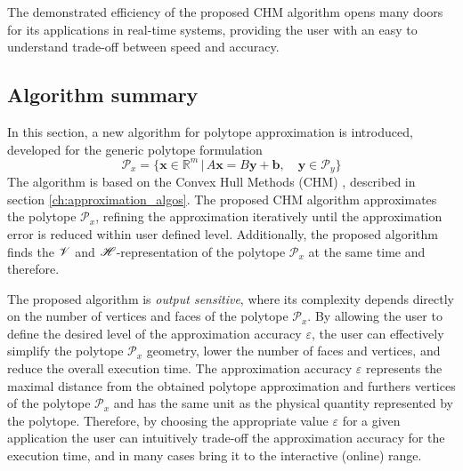 The demonstrated efficiency of the proposed CHM algorithm opens many doors for its applications in real-time systems, providing the user with an easy to understand trade-off between speed and accuracy.

\subsection{Algorithm summary}

In this section, a new algorithm for polytope approximation is introduced, developed for the generic polytope formulation
\begin{equation}
    \mathcal{P}_x = \big\{ \bm{x}\in \mathbb{R}^{m}\, |\,A\bm{x} = B\bm{y} + \bm{b}, \quad  \bm{y}\in\mathcal{P}_y  \big\}
    \label{eq:generic_polyt_view_revisit3}
\end{equation}
The algorithm is based on the Convex Hull Methods (CHM) \cite{lassez1992quantifier}, described in section \ref{ch:approximation_algos}. The proposed CHM algorithm approximates the polytope $\mathcal{P}_x$, refining the approximation iteratively until the approximation error is reduced within user defined level. 
Additionally, the proposed algorithm finds the $\mathscr{V}$ and $\mathscr{H}$-representation of the polytope $\mathcal{P}_x$ at the same time and therefore.

The proposed algorithm is \textit{output sensitive}, where its complexity depends directly on the number of vertices and faces of the polytope  $\mathcal{P}_x$. By allowing the user to define the desired level of the approximation accuracy $\varepsilon$, the user can effectively simplify the polytope $\mathcal{P}_x$ geometry, lower the number of faces and vertices, and reduce the overall execution time. 
The approximation accuracy $\varepsilon$ represents the maximal distance from the obtained polytope approximation and furthers vertices of the polytope $\mathcal{P}_x$ and has the same unit as the physical quantity represented by the polytope. 
Therefore, by choosing the appropriate value $\varepsilon$ for a given application the user can intuitively trade-off the approximation accuracy for the execution time, and in many cases bring it to the interactive (online) range. 

